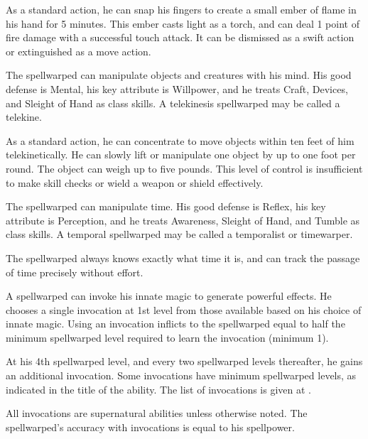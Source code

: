         As a standard action, he can snap his fingers to create a small ember of flame in his hand for 5 minutes.
        This ember casts light as a torch, and can deal 1 point of fire damage with a successful touch attack.
        It can be dismissed as a swift action or extinguished as a move action.

        The spellwarped can manipulate objects and creatures with his mind.
        His good defense is Mental, his key attribute is Willpower, and he treats Craft, Devices, and Sleight of Hand as class skills.
        A telekinesis spellwarped may be called a telekine.

        As a standard action, he can concentrate to move objects within ten feet of him telekinetically.
        He can slowly lift or manipulate one object by up to one foot per round.
        The object can weigh up to five pounds.
        This level of control is insufficient to make skill checks or wield a weapon or shield effectively.

        The spellwarped can manipulate time.
        His good defense is Reflex, his key attribute is Perception, and he treats Awareness, Sleight of Hand, and Tumble as class skills.
        A temporal spellwarped may be called a temporalist or timewarper.

        The spellwarped always knows exactly what time it is, and can track the passage of time precisely without effort.

        A spellwarped can invoke his innate magic to generate powerful effects.
        He chooses a single invocation at 1st level from those available based on his choice of innate magic.
        Using an invocation inflicts  to the spellwarped equal to half the minimum spellwarped level required to learn the invocation (minimum 1).

        At his 4th spellwarped level, and every two spellwarped levels thereafter, he gains an additional invocation.
        Some invocations have minimum spellwarped levels, as indicated in the title of the ability.
        The list of invocations is given at .

        All invocations are supernatural abilities unless otherwise noted.
        The spellwarped's accuracy with invocations is equal to his spellpower.

